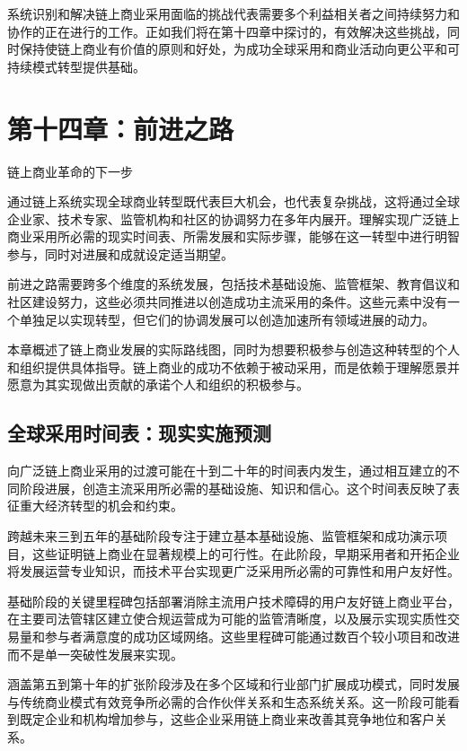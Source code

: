 \documentclass[
  Letterpaper,
]{scrbook}
\begin{document}
系统识别和解决链上商业采用面临的挑战代表需要多个利益相关者之间持续努力和协作的正在进行的工作。正如我们将在第十四章中探讨的，有效解决这些挑战，同时保持使链上商业有价值的原则和好处，为成功全球采用和商业活动向更公平和可持续模式转型提供基础。

\chapter{第十四章：前进之路}\label{sec-path-forward}

链上商业革命的下一步

通过链上系统实现全球商业转型既代表巨大机会，也代表复杂挑战，这将通过全球企业家、技术专家、监管机构和社区的协调努力在多年内展开。理解实现广泛链上商业采用所必需的现实时间表、所需发展和实际步骤，能够在这一转型中进行明智参与，同时对进展和成就设定适当期望。

前进之路需要跨多个维度的系统发展，包括技术基础设施、监管框架、教育倡议和社区建设努力，这些必须共同推进以创造成功主流采用的条件。这些元素中没有一个单独足以实现转型，但它们的协调发展可以创造加速所有领域进展的动力。

本章概述了链上商业发展的实际路线图，同时为想要积极参与创造这种转型的个人和组织提供具体指导。链上商业的成功不依赖于被动采用，而是依赖于理解愿景并愿意为其实现做出贡献的承诺个人和组织的积极参与。

\section{全球采用时间表：现实实施预测}\label{ux5168ux7403ux91c7ux7528ux65f6ux95f4ux8868ux73b0ux5b9eux5b9eux65bdux9884ux6d4b}

向广泛链上商业采用的过渡可能在十到二十年的时间表内发生，通过相互建立的不同阶段进展，创造主流采用所必需的基础设施、知识和信心。这个时间表反映了表征重大经济转型的机会和约束。

跨越未来三到五年的基础阶段专注于建立基本基础设施、监管框架和成功演示项目，这些证明链上商业在显著规模上的可行性。在此阶段，早期采用者和开拓企业将发展运营专业知识，而技术平台实现更广泛采用所必需的可靠性和用户友好性。

基础阶段的关键里程碑包括部署消除主流用户技术障碍的用户友好链上商业平台，在主要司法管辖区建立使合规运营成为可能的监管清晰度，以及展示实现实质性交易量和参与者满意度的成功区域网络。这些里程碑可能通过数百个较小项目和改进而不是单一突破性发展来实现。

涵盖第五到第十年的扩张阶段涉及在多个区域和行业部门扩展成功模式，同时发展与传统商业模式有效竞争所必需的合作伙伴关系和生态系统关系。这一阶段可能看到既定企业和机构增加参与，这些企业采用链上商业来改善其竞争地位和客户关系。
\end{document}
